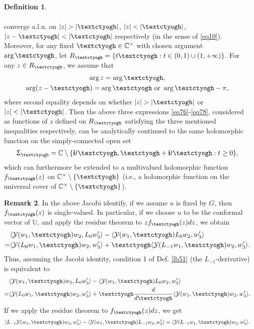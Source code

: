 \documentclass[12pt,a4paper,notitlepage]{article}
\theoremstyle{definition}
\newtheorem{df}{Definition}[subsection]
\newtheorem{rem}[df]{Remark}
\theoremstyle{plain}
\newcommand{\mc}{\mathcal}
\newcommand{\bk}[1]{\langle {#1}\rangle}
\newcommand{\im}{\mathbf{i}}
\newcommand{\Ubb}{\mathbb U}
\newcommand{\Cbb}{\mathbb C}
\newcommand{\tipaz}{\text{\textctyogh}}
\numberwithin{equation}{subsection}
\begin{document}
\begin{df}
\begin{enumerate}
\begin{gather}
\end{gather}
converge a.l.u.  on $|z|>|\tipaz|$, $|z|<|\tipaz|$, $|z-\tipaz|<|\tipaz|$ respectively (in the sense of \eqref{eq10}). Moreover, for any fixed $\tipaz\in\Cbb^\times$ with chosen argument $\arg \tipaz$, let $R_{\tipaz}=\{t\tipaz:t\in(0,1)\cup (1,+\infty)\}$. For any $z\in R_{\tipaz}$, we assume that 
\begin{gather}
\begin{array}{c}
\arg z=\arg\tipaz,\\[0.7ex]
\arg(z-\tipaz)=\arg \tipaz\text{ or }\arg \tipaz-\pi,
\end{array}	\label{eq82}
\end{gather}
where second equality depends on whether $|z|>|\tipaz|$ or $|z|<|\tipaz|$. Then the above three expressions \eqref{eq76}-\eqref{eq78}, considered as functions of $z$ defined on $R_{\tipaz}$ satisfying the three mentioned inequalities respectively, can be analytically continued to the same holomorphic function on the simply-connected open set
\begin{align*}
\Upsigma_\tipaz=\Cbb\setminus\{\im t\tipaz,\tipaz+\im t\tipaz:t\geq 0\},	
\end{align*}
which can furthermore be extended to a multivalued holomorphic function $f_{\tipaz}(z)$ on $\Cbb^\times\setminus\{\tipaz\}$ (i.e., a holomorphic function on the universal cover of $\Cbb^\times\setminus\{\tipaz\}$).
\end{enumerate}
\end{df}

\begin{rem}\label{lb55}
In the above Jacobi identify, if we assume $u$ is fixed by $G$, then $f_\tipaz(z)$ is single-valued. In particular, if we choose $u$ to be the conformal vector of $\Ubb$, and apply the residue theorem to $zf_\tipaz(z)dz$, we obtain
\begin{align*}
	&\bk{\mc Y(w_1,\tipaz)w_2,L_0w_3'}-\bk{\mc Y(w_1,\tipaz)L_0w_2,w_3'}\nonumber\\
	=&	\bk{\mc Y(L_0w_1,\tipaz)w_2,w_3'}+\tipaz\bk{\mc Y(L_{-1}w_1,\tipaz)w_2,w_3'}.
\end{align*}
Thus, assuming the Jacobi identity, condition 1  of Def. \ref{lb51}  (the $L_{-1}$-derivative) is equivalent to
\begin{align}
	&\bk{\mc Y(w_1,\tipaz)w_2,L_0w_3'}-\bk{\mc Y(w_1,\tipaz)L_0w_2,w_3'}\nonumber\\
	=&	\bk{\mc Y(L_0w_1,\tipaz)w_2,w_3'}+\tipaz\frac d{d\tipaz}\bk{\mc Y(w_1,\tipaz)w_2,w_3'}\label{eq79}.
\end{align}	
If we apply the residue theorem to $f_\tipaz(z)dz$, we get
\begin{align}
\bk{L_{-1}\mc Y(w_1,\tipaz)w_2,w_3'}-\bk{\mc Y(w_1,\tipaz)L_{-1}w_2,w_3'}=\bk{\mc Y(L_{-1}w_1,\tipaz)w_2,w_3'}.\label{eq98}	
\end{align}
\end{rem}	
\end{document}
